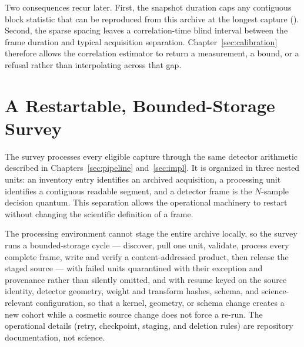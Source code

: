 Two consequences recur later.  First, the snapshot duration caps any contiguous
block statistic that can be reproduced from this archive at the longest capture
().  Second, the sparse spacing leaves a correlation-time blind
interval between the frame duration and typical acquisition separation.
Chapter~\ref{sec:calibration} therefore allows the correlation estimator to
return a measurement, a bound, or a refusal rather than interpolating across
that gap.

\section{A Restartable, Bounded-Storage Survey}
\label{sec:survey:trawl}

The survey processes every eligible capture through the same detector arithmetic
described in Chapters~\ref{sec:pipeline} and~\ref{sec:impl}.  It is organized in
three nested units: an inventory entry identifies an archived acquisition, a
processing unit identifies a contiguous readable segment, and a detector frame
is the $N$-sample decision quantum.  This separation allows the operational
machinery to restart without changing the scientific definition of a frame.

The processing environment cannot stage the entire archive locally, so the
survey runs a bounded-storage cycle --- discover, pull one unit, validate,
process every complete frame, write and verify a content-addressed product,
then release the staged source --- with failed units quarantined with their
exception and provenance rather than silently omitted, and with resume keyed on
the source identity, detector geometry, weight and transform hashes, schema,
and science-relevant configuration, so that a kernel, geometry, or schema
change creates a new cohort while a cosmetic source change does not force a
re-run.  The operational details (retry, checkpoint, staging, and deletion
rules) are repository documentation, not science.

